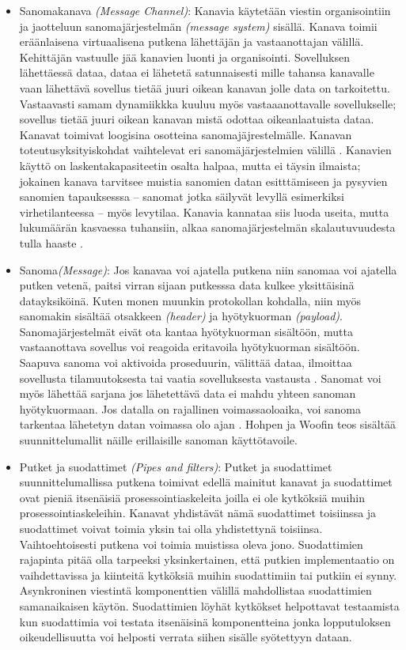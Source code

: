 \begin{itemize}
   \item Sanomakanava \textit{(Message Channel)}:
      Kanavia käytetään viestin organisointiin ja jaotteluun sanomajärjestelmän \textit{(message system)} sisällä. Kanava toimii eräänlaisena virtuaalisena putkena lähettäjän ja vastaanottajan välillä. Kehittäjän vastuulle jää kanavien luonti ja organisointi. Sovelluksen lähettäessä dataa, dataa ei lähetetä satunnaisesti mille tahansa kanavalle vaan lähettävä sovellus tietää juuri oikean kanavan jolle data on tarkoitettu. Vastaavasti samam dynamiikkka kuuluu myös vastaaanottavalle sovellukselle; sovellus tietää juuri oikean kanavan mistä odottaa oikeanlaatuista dataa.
      Kanavat toimivat loogisina osotteina sanomajäjrestelmälle. Kanavan toteutusyksityiskohdat vaihtelevat eri sanomäjärjestelmien välillä \citep{EnterpriseIntegration} \citep{Hohpe2004}.
      Kanavien käyttö on laskentakapasiteetin osalta halpaa, mutta ei täysin ilmaista; jokainen kanava tarvitsee muistia sanomien datan esitttämiseen ja pysyvien sanomien tapauksesssa -- sanomat jotka säilyvät levyllä esimerkiksi virhetilanteessa -- myös levytilaa. Kanavia kannataa siis luoda useita, mutta lukumäärän kasvaessa tuhansiin, alkaa sanomajärjestelmän skalautuvuudesta tulla haaste \citep{Hohpe2004}.
   \item Sanoma\textit{(Message)}:
      Jos kanavaa voi ajatella putkena niin sanomaa voi ajatella putken vetenä, paitsi virran sijaan putkesssa data kulkee yksittäisinä datayksiköinä. Kuten monen muunkin protokollan kohdalla, niin myös sanomakin sisältää otsakkeen \textit{(header)} ja  hyötykuorman \textit{(payload)}. Sanomajärjestelmät eivät ota kantaa hyötykuorman sisältöön, mutta vastaanottava sovellus voi reagoida eritavoila hyötykuorman sisältöön. Saapuva sanoma voi aktivoida proseduurin, välittää dataa, ilmoittaa sovellusta tilamuutoksesta tai vaatia sovelluksesta vastausta \citep{Hohpe2004}. Sanomat voi myös lähettää sarjana jos lähetettävä data ei mahdu yhteen sanoman hyötykuormaan. Jos datalla on rajallinen voimassaoloaika, voi sanoma tarkentaa lähetetyn datan voimassa olo ajan \citep{Hohpe2004}. Hohpen ja Woofin teos sisältää suunnittelumallit näille erillaisille sanoman käyttötavoile.

   \newpage
   \item Putket ja suodattimet \textit{(Pipes and filters)}:
      Putket ja suodattimet suunnittelumallissa putkena toimivat edellä mainitut kanavat ja suodattimet ovat pieniä itsenäisiä prosessointiaskeleita joilla ei ole kytköksiä muihin prosessointiaskeleihin. Kanavat yhdistävät nämä suodattimet toisiinssa ja suodattimet voivat toimia yksin tai olla yhdistettynä toisiinsa. Vaihtoehtoisesti putkena voi toimia muistissa oleva jono. Suodattimien rajapinta pitää olla tarpeeksi yksinkertainen, että putkien implementaatio on vaihdettavissa ja kiinteitä kytköksiä muihin suodattimiin tai putkiin ei synny.
      Asynkroninen viestintä komponenttien välillä mahdollistaa suodattimien samanaikaisen käytön.
   Suodattimien löyhät kytkökset helpottavat testaamista kun suodattimia voi testata itsenäisinä komponentteina jonka lopputuloksen oikeudellisuutta voi helposti verrata siihen sisälle syötettyyn dataan.



\end{itemize}
